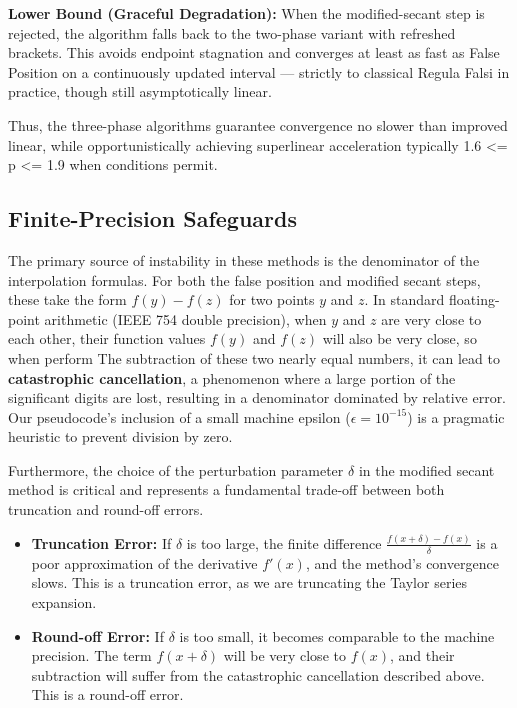 \documentclass[amsmath, amssymb, aps]{revtex4-2}
\begin{document}
\textbf{Lower Bound (Graceful Degradation):} When the modified-secant step is rejected, the algorithm falls back to the two-phase variant with refreshed brackets. This avoids endpoint stagnation and converges at least as fast as False Position on a continuously updated interval — strictly to classical Regula Falsi in practice, though still asymptotically linear.

Thus, the three-phase algorithms guarantee convergence no slower than improved linear, while opportunistically achieving superlinear acceleration typically 1.6 <= p <= 1.9 when conditions permit.

\subsection{Finite-Precision Safeguards}

The primary source of instability in these methods is the denominator of the interpolation formulas. For both the false position and modified secant steps, these take the form $f(y) - f(z)$ for two points $y$ and $z$. In standard floating-point arithmetic (IEEE 754 double precision), when $y$ and $z$ are very close to each other, their function values $f(y)$ and $f(z)$ will also be very close, so when perform The subtraction of these two nearly equal numbers, it can lead to \textbf{catastrophic cancellation}, a phenomenon where a large portion of the significant digits are lost, resulting in a denominator dominated by relative error. Our pseudocode's inclusion of a small machine epsilon ($\epsilon=10^{-15}$) is a pragmatic heuristic to prevent division by zero.

Furthermore, the choice of the perturbation parameter $\delta$ in the modified secant method is critical and represents a fundamental trade-off between both truncation and round-off errors.
\begin{itemize}
    \item \textbf{Truncation Error:} If $\delta$ is too large, the finite difference $\frac{f(x+\delta) - f(x)}{\delta}$ is a poor approximation of the derivative $f'(x)$, and the method's convergence slows. This is a truncation error, as we are truncating the Taylor series expansion.
    \item \textbf{Round-off Error:} If $\delta$ is too small, it becomes comparable to the machine precision. The term $f(x+\delta)$ will be very close to $f(x)$, and their subtraction will suffer from the catastrophic cancellation described above. This is a round-off error.
\end{itemize}
\end{document}
